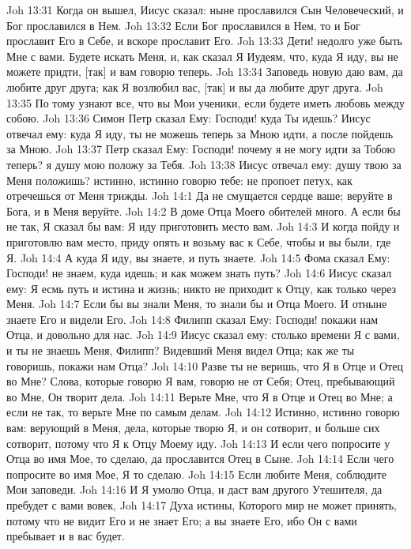 Joh 13:31  Когда он вышел, Иисус сказал: ныне прославился Сын Человеческий, и Бог прославился в Нем.
Joh 13:32  Если Бог прославился в Нем, то и Бог прославит Его в Себе, и вскоре прославит Его.
Joh 13:33  Дети! недолго уже быть Мне с вами. Будете искать Меня, и, как сказал Я Иудеям, что, куда Я иду, вы не можете придти, [так] и вам говорю теперь.
Joh 13:34  Заповедь новую даю вам, да любите друг друга; как Я возлюбил вас, [так] и вы да любите друг друга.
Joh 13:35  По тому узнают все, что вы Мои ученики, если будете иметь любовь между собою.
Joh 13:36  Симон Петр сказал Ему: Господи! куда Ты идешь? Иисус отвечал ему: куда Я иду, ты не можешь теперь за Мною идти, а после пойдешь за Мною.
Joh 13:37  Петр сказал Ему: Господи! почему я не могу идти за Тобою теперь? я душу мою положу за Тебя.
Joh 13:38  Иисус отвечал ему: душу твою за Меня положишь? истинно, истинно говорю тебе: не пропоет петух, как отречешься от Меня трижды.
Joh 14:1  Да не смущается сердце ваше; веруйте в Бога, и в Меня веруйте.
Joh 14:2  В доме Отца Моего обителей много. А если бы не так, Я сказал бы вам: Я иду приготовить место вам.
Joh 14:3  И когда пойду и приготовлю вам место, приду опять и возьму вас к Себе, чтобы и вы были, где Я.
Joh 14:4  А куда Я иду, вы знаете, и путь знаете.
Joh 14:5  Фома сказал Ему: Господи! не знаем, куда идешь; и как можем знать путь?
Joh 14:6  Иисус сказал ему: Я есмь путь и истина и жизнь; никто не приходит к Отцу, как только через Меня.
Joh 14:7  Если бы вы знали Меня, то знали бы и Отца Моего. И отныне знаете Его и видели Его.
Joh 14:8  Филипп сказал Ему: Господи! покажи нам Отца, и довольно для нас.
Joh 14:9  Иисус сказал ему: столько времени Я с вами, и ты не знаешь Меня, Филипп? Видевший Меня видел Отца; как же ты говоришь, покажи нам Отца?
Joh 14:10  Разве ты не веришь, что Я в Отце и Отец во Мне? Слова, которые говорю Я вам, говорю не от Себя; Отец, пребывающий во Мне, Он творит дела.
Joh 14:11  Верьте Мне, что Я в Отце и Отец во Мне; а если не так, то верьте Мне по самым делам.
Joh 14:12  Истинно, истинно говорю вам: верующий в Меня, дела, которые творю Я, и он сотворит, и больше сих сотворит, потому что Я к Отцу Моему иду.
Joh 14:13  И если чего попросите у Отца во имя Мое, то сделаю, да прославится Отец в Сыне.
Joh 14:14  Если чего попросите во имя Мое, Я то сделаю.
Joh 14:15  Если любите Меня, соблюдите Мои заповеди.
Joh 14:16  И Я умолю Отца, и даст вам другого Утешителя, да пребудет с вами вовек,
Joh 14:17  Духа истины, Которого мир не может принять, потому что не видит Его и не знает Его; а вы знаете Его, ибо Он с вами пребывает и в вас будет.
